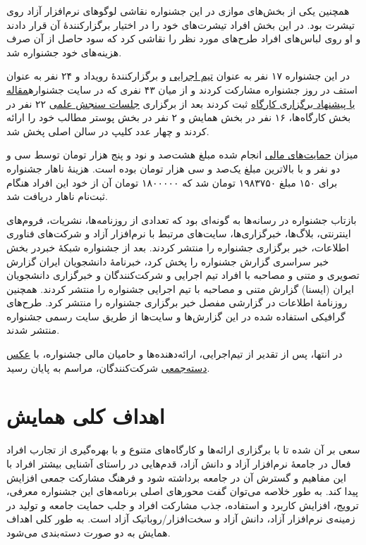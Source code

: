 \documentclass{article}
\begin{document}
{همچنین یکی از بخش‌های موازی در این جشنواره نقاشی لوگوهای نرم‌افزار آزاد روی تیشرت بود. در این بخش افراد تیشرت‌های خود را در اختیار برگزارکنندهٔ آن قرار دادند و او روی لباس‌های افراد طرح‌های مورد نظر را نقاشی کرد که سود حاصل از آن صرف هزینه‌های خود جشنواره شد.

در این جشنواره ۱۷ نفر به عنوان \href{http://sfd.fsug.ir/1395/patronage/staff}{تیم اجرایی} و برگزارکنندهٔ رویداد و ۲۴ نفر به عنوان\hspace{100pt} استف در روز جشنواره مشارکت کردند و از میان ۴۳ نفری که در سایت جشنواره\newline \href{http://sfd.fsug.ir/1395/plan/articles}{مقاله یا پیشنهاد برگزاری کارگاه} ثبت کردند بعد از برگزاری \href{http://sfd.fsug.ir/1395/referee}{جلسات سنجش علمی} ۲۲ نفر در بخش کارگاه‌ها، ۱۶ نفر در بخش همایش و ۲ نفر در بخش پوستر مطالب خود را ارائه کردند و چهار عدد کلیپ در سالن اصلی پخش شد.

میزان \href{http://sfd.fsug.ir/1395/patronage/donation}{حمایت‌های مالی} انجام شده مبلغ هشت‌صد و نود و پنج هزار تومان توسط سی و دو نفر و با بالاترین مبلغ یک‌صد و سی هزار تومان بوده است. هزینهٔ ناهار جشنواره برای ۱۵۰ مبلغ ۱۹۸۳۷۵۰ تومان شد که ۱۸۰۰۰۰۰ تومان آن از خود این افراد هنگام ثبت‌نام ناهار دریافت شد.

بازتاب جشنواره در رسانه‌ها به گونه‌ای بود که تعدادی از روزنامه‌ها، نشریات، فروم‌های اینترنتی، بلاگ‌ها، خبرگزاری‌ها، سایت‌های مرتبط با نرم‌افزار آزاد و شرکت‌های فناوری اطلاعات، خبر برگزاری جشنواره را منتشر کردند. بعد از جشنواره شبکهٔ خبردر بخش خبر سراسری گزارش جشنواره را پخش کرد، خبرنامهٔ دانشجویان ایران گزارش تصویری و متنی و مصاحبه با افراد تیم اجرایی و شرکت‌کنندگان و خبرگزاری دانشجویان ایران (ایسنا) گزارش متنی و مصاحبه با تیم اجرایی جشنواره را منتشر کردند. همچنین روزنامهٔ اطلاعات در گزارشی مفصل خبر برگزاری جشنواره را منتشر کرد. طرح‌های گرافیکی استفاده شده در این گزارش‌ها و سایت‌ها از طریق سایت رسمی جشنواره منتشر شدند.

در انتها، پس از تقدیر از تیم‌اجرایی، ارائه‌دهنده‌ها و حامیان مالی جشنواره، با \href{http://sfd.fsug.ir/1395/photos}{عکس دسته‌جمعی} شرکت‌کنندگان، مراسم به پایان رسید.


\section{اهداف کلی همایش}
سعی بر آن شده تا با برگزاری ارائه‌ها و کارگاه‌های متنوع و با بهره‌گیری از تجارب افراد فعال در جامعهٔ نرم‌افزار آزاد و دانش آزاد، قدم‌هایی در راستای آشنایی بیشتر افراد با این مفاهیم و گسترش آن در جامعه برداشته شود و فرهنگ مشارکت جمعی افزایش پیدا کند. به طور خلاصه می‌توان گفت محورهای اصلی برنامه‌های این جشنواره معرفی، ترویج، افزایش کاربرد و استفاده، جذب مشارکت افراد و جلب حمایت جامعه و تولید در زمینه‌ی نرم‌افزار آزاد، دانش آزاد و سخت‌افزار/روباتیک آزاد است. به طور کلی اهداف همایش به دو صورت دسته‌بندی می‌شود.

}
\end{document}
